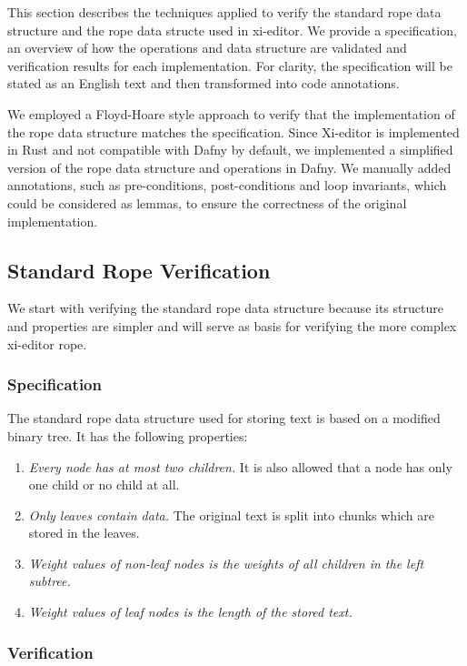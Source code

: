This section describes the techniques applied to verify the standard rope data structure and the rope data structe used in xi-editor.
We provide a specification, an overview of how the operations and data structure are validated and verification results for each implementation.
For clarity, the specification will be stated as an English text and then transformed into code annotations.

We employed a Floyd-Hoare style approach to verify that the implementation of the rope data structure matches the specification.
Since Xi-editor is implemented in Rust and not compatible with Dafny by default, we implemented a simplified version of the rope data structure and operations in Dafny.
We manually added annotations, such as pre-conditions, post-conditions and loop invariants, which could be considered as lemmas, to ensure the correctness of the original implementation.


\subsection{Standard Rope Verification}

We start with verifying the standard rope data structure because its structure and properties are simpler and will serve as basis for verifying the more complex xi-editor rope.

\subsubsection{Specification}

The standard rope data structure used for storing text is based on a modified binary tree. 
It has the following properties:

\begin{enumerate}
  \item \textit{Every node has at most two children.} It is also allowed that a node has only one child or no child at all.
  \item \textit{Only leaves contain data.} The original text is split into chunks which are stored in the leaves.
  \item \textit{Weight values of non-leaf nodes is the weights of all children in the left subtree.}
  \item \textit{Weight values of leaf nodes is the length of the stored text.}
\end{enumerate}

\subsubsection{Verification}

